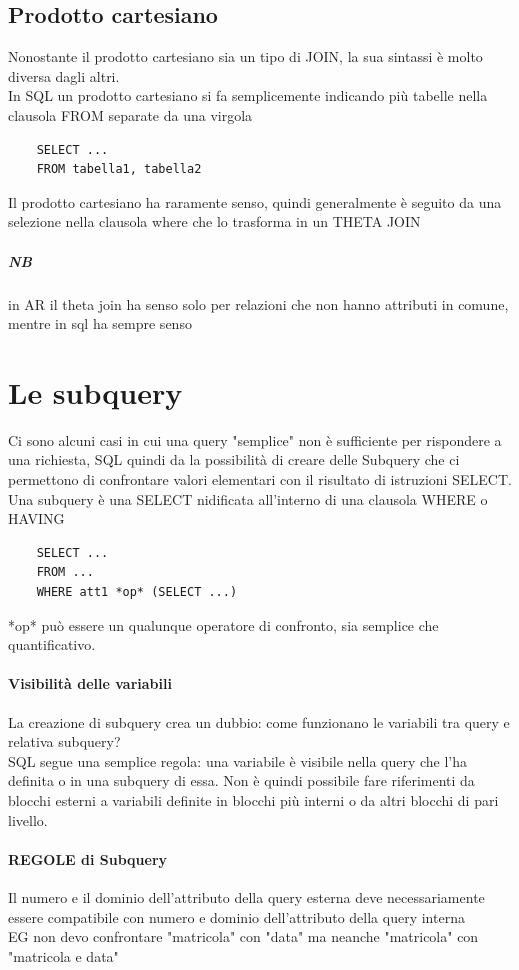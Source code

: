 \documentclass[12pt, a4paper, openany]{book}
\begin{document}
\subsection*{Prodotto cartesiano}
Nonostante il prodotto cartesiano sia un tipo di JOIN, la sua sintassi è molto diversa dagli altri.
\\In SQL un prodotto cartesiano si fa semplicemente indicando più tabelle nella clausola FROM separate da una virgola
\begin{Verbatim}
    SELECT ...
    FROM tabella1, tabella2
\end{Verbatim}
Il prodotto cartesiano ha raramente senso, quindi generalmente è seguito da una selezione nella clausola where che lo trasforma in un THETA JOIN
\subparagraph{NB} in AR il theta join ha senso solo per relazioni che non hanno attributi in comune, mentre in sql ha sempre senso


\section{Le subquery}
Ci sono alcuni casi in cui una query "semplice" non è sufficiente per rispondere a una richiesta, SQL quindi da la possibilità di creare delle Subquery che ci permettono di confrontare valori elementari con il risultato di istruzioni SELECT.
Una subquery è una SELECT nidificata all'interno di una clausola WHERE o HAVING
\begin{verbatim}
    SELECT ...
    FROM ... 
    WHERE att1 *op* (SELECT ...)
\end{verbatim}
*op* può essere un qualunque operatore di confronto, sia semplice che quantificativo.

\paragraph{Visibilità delle variabili}
La creazione di subquery crea un dubbio: come funzionano le variabili tra query e relativa subquery?\\
SQL segue una semplice regola: una variabile è visibile nella query che l'ha definita o in una subquery di essa.
Non è quindi possibile fare riferimenti da blocchi esterni a variabili definite in blocchi più interni o da altri blocchi di pari livello.

\paragraph{REGOLE di Subquery}
Il numero e il dominio dell'attributo della query esterna deve necessariamente essere compatibile con numero e dominio dell'attributo della query interna\\
EG non devo confrontare "matricola" con "data" ma neanche "matricola" con "matricola e data"
\end{document}
